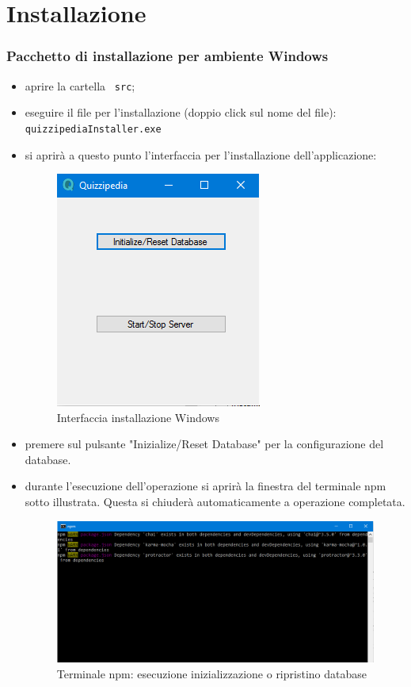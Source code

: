\documentclass[12pt,a4paper]{article}
\begin{document}
	\newpage
	\section{Installazione}\label{install}
		
		\subsubsection{Pacchetto di installazione per ambiente Windows}
		\begin{itemize}
			\item aprire la cartella \texttt{ src};
			\item eseguire il file per l'installazione (doppio click sul nome del file): \texttt{quizzipediaInstaller.exe}
			\item si aprirà a questo punto l'interfaccia per l'installazione dell'applicazione:
			\begin{figure}[H]	
				\centering
				\includegraphics[width=0.4\linewidth]{../img/manualeInstallazione/win_installer01.png}
				\caption{Interfaccia installazione Windows}
				\label{Interfaccia installazione Windows}
			\end{figure}
			
			\item premere sul pulsante "Inizialize/Reset Database" per la configurazione del database. 
			\item durante l'esecuzione dell'operazione si aprirà la finestra del terminale npm sotto illustrata. Questa si chiuderà automaticamente a operazione completata.
			\begin{figure}[H]	
				\centering
				\includegraphics[width=0.8\linewidth]{../img/manualeInstallazione/win_installer02.png}
				\caption{Terminale npm: esecuzione inizializzazione o ripristino database}
				\label{Terminale npm: esecuzione inizializzazione o ripristino database}
			\end{figure}
			

\end{itemize}
\end{document}
